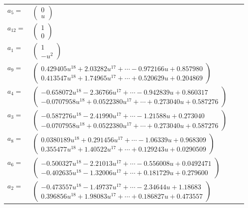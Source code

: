 \documentclass[1p]{elsarticle_modified}
\theoremstyle{definition}
\begin{document}
\begin{tabular}{m{7pt} m{180pt} m{7pt} m{180pt} }
\flushright $a_{5}=$&$\begin{pmatrix}0\\u\end{pmatrix}$ \\
\flushright $a_{12}=$&$\begin{pmatrix}1\\0\end{pmatrix}$ \\
\flushright $a_{1}=$&$\begin{pmatrix}1\\- u^2\end{pmatrix}$ \\
\flushright $a_{9}=$&$\begin{pmatrix}0.429405 u^{18}+2.03282 u^{17}+\cdots-0.972166 u+0.857980\\0.413547 u^{18}+1.74965 u^{17}+\cdots+0.520629 u+0.204869\end{pmatrix}$ \\
\flushright $a_{4}=$&$\begin{pmatrix}-0.658072 u^{18}-2.36766 u^{17}+\cdots-0.942839 u+0.860317\\-0.0707958 u^{18}+0.0522380 u^{17}+\cdots+0.273040 u+0.587276\end{pmatrix}$ \\
\flushright $a_{3}=$&$\begin{pmatrix}-0.587276 u^{18}-2.41990 u^{17}+\cdots-1.21588 u+0.273040\\-0.0707958 u^{18}+0.0522380 u^{17}+\cdots+0.273040 u+0.587276\end{pmatrix}$ \\
\flushright $a_{8}=$&$\begin{pmatrix}0.0380189 u^{18}+0.291456 u^{17}+\cdots-1.06339 u+0.968309\\0.355477 u^{18}+1.40522 u^{17}+\cdots+0.129243 u+0.0290509\end{pmatrix}$ \\
\flushright $a_{6}=$&$\begin{pmatrix}-0.500327 u^{18}-2.21013 u^{17}+\cdots-0.556008 u+0.0492471\\-0.402635 u^{18}-1.32006 u^{17}+\cdots+0.181729 u+0.279600\end{pmatrix}$ \\
\flushright $a_{2}=$&$\begin{pmatrix}-0.473557 u^{18}-1.49737 u^{17}+\cdots-2.34644 u+1.18683\\0.396856 u^{18}+1.98083 u^{17}+\cdots+0.186827 u+0.473557\end{pmatrix}$ \\

\end{tabular}
\end{document}
